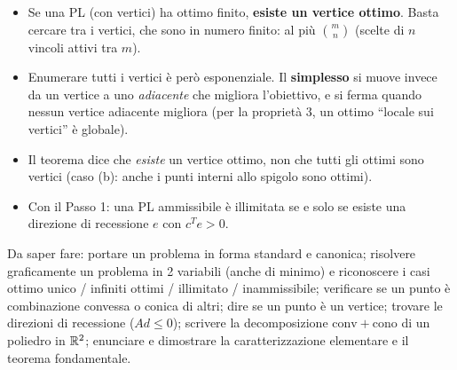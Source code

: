 \begin{oss}[conseguenze]
\begin{itemize}[nosep]
\item Se una PL (con vertici) ha ottimo finito, \textbf{esiste un vertice ottimo}. Basta cercare tra i vertici, che sono in numero finito: al più $\binom{m}{n}$ (scelte di $n$ vincoli attivi tra $m$).
\item Enumerare tutti i vertici è però esponenziale. Il \textbf{simplesso} si muove invece da un vertice a uno \emph{adiacente} che migliora l'obiettivo, e si ferma quando nessun vertice adiacente migliora (per la proprietà 3, un ottimo ``locale sui vertici'' è globale).
\item Il teorema dice che \emph{esiste} un vertice ottimo, non che tutti gli ottimi sono vertici (caso (b): anche i punti interni allo spigolo sono ottimi).
\item Con il Passo 1: una PL ammissibile è illimitata se e solo se esiste una direzione di recessione $e$ con $c^Te>0$.
\end{itemize}
\end{oss}

\begin{esame}
Da saper fare: portare un problema in forma standard e canonica; risolvere graficamente un problema in 2 variabili (anche di minimo) e riconoscere i casi ottimo unico / infiniti ottimi / illimitato / inammissibile; verificare se un punto è combinazione convessa o conica di altri; dire se un punto è un vertice; trovare le direzioni di recessione ($Ad\le0$); scrivere la decomposizione $\mathrm{conv}+\mathrm{cono}$ di un poliedro in $\mathbb{R}^2$; enunciare e dimostrare la caratterizzazione elementare e il teorema fondamentale.
\end{esame}
